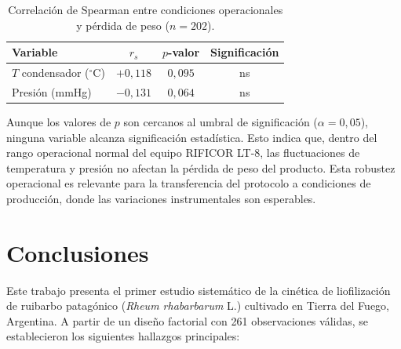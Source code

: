 \documentclass[12pt, a4paper]{article}
\begin{document}
\begin{table}[H]
\centering
\caption{Correlación de Spearman entre condiciones operacionales y pérdida de peso ($n = 202$).}
\label{tab:spearman}
\begin{tabular}{@{}lccc@{}}
\toprule
\textbf{Variable} & $r_s$ & $p$\textbf{-valor} & \textbf{Significación} \\
\midrule
$T$ condensador ($^\circ$C) &  $+0{,}118$ & $0{,}095$ & ns \\
Presión (mmHg)              & $-0{,}131$ & $0{,}064$ & ns \\
\bottomrule
\end{tabular}
\end{table}

Aunque los valores de $p$ son cercanos al umbral de significación ($\alpha = 0{,}05$), ninguna variable alcanza significación estadística. Esto indica que, dentro del rango operacional normal del equipo RIFICOR LT-8, las fluctuaciones de temperatura y presión no afectan la pérdida de peso del producto. Esta robustez operacional es relevante para la transferencia del protocolo a condiciones de producción, donde las variaciones instrumentales son esperables.

\section{Conclusiones}

Este trabajo presenta el primer estudio sistemático de la cinética de liofilización de ruibarbo patagónico (\textit{Rheum rhabarbarum} L.) cultivado en Tierra del Fuego, Argentina. A partir de un diseño factorial con 261 observaciones válidas, se establecieron los siguientes hallazgos principales:
\end{document}
